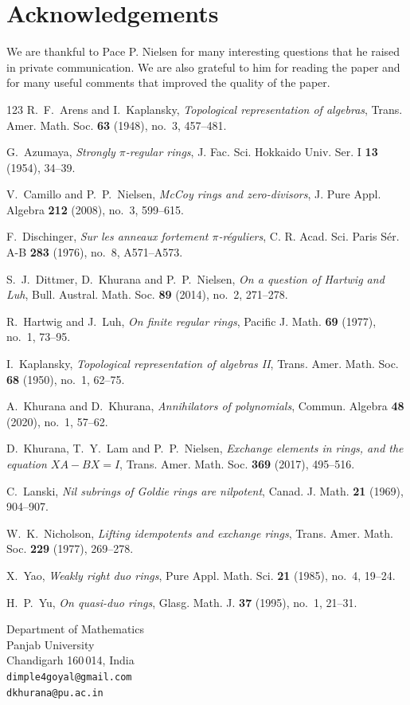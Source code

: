 \documentclass[12pt]{article}
\theoremstyle{plain}
\theoremstyle{definition}
\begin{document}
\section{Acknowledgements}
We are thankful to Pace P. Nielsen for many interesting questions that he raised in private communication. We are also grateful to him for reading the paper and for many useful comments that improved the quality of the paper. 
\begin{thebibliography}{123}
 R.~F.~Arens and I.~Kaplansky, {\em Topological representation of algebras}, 
Trans. Amer. Math. Soc. {\bf 63} (1948), no.~3, 457--481.

 G.~Azumaya, {\em Strongly $\pi$-regular rings}, 
J. Fac. Sci. Hokkaido Univ. Ser. I {\bf 13} (1954), 34--39.

 V.~Camillo and P.~P.~Nielsen, {\em McCoy rings and zero-divisors}, 
J. Pure Appl. Algebra {\bf 212} (2008), no.~3, 599--615.

 F.~Dischinger, {\em Sur les anneaux fortement $\pi$-réguliers}, 
C. R. Acad. Sci. Paris Sér. A-B {\bf 283} (1976), no.~8, A571--A573.

 S.~J.~Dittmer, D.~Khurana and P.~P.~Nielsen, {\em On a question of Hartwig and Luh}, 
Bull. Austral. Math. Soc. {\bf 89} (2014), no.~2, 271--278.

 R.~Hartwig and J.~Luh, {\em On finite regular rings}, 
Pacific J. Math. {\bf 69} (1977), no.~1, 73--95.

 I.~Kaplansky, {\em Topological representation of algebras II}, 
Trans. Amer. Math. Soc. {\bf 68} (1950), no.~1, 62--75.

 A.~Khurana and D.~Khurana, {\em Annihilators of polynomials}, 
Commun. Algebra {\bf 48} (2020), no.~1, 57--62.

 D.~Khurana, T.~Y.~Lam and P.~P.~Nielsen, 
{\em Exchange elements in rings, and the equation $XA - BX = I$}, 
Trans. Amer. Math. Soc. {\bf 369} (2017), 495--516.

 C.~Lanski, {\em Nil subrings of Goldie rings are nilpotent}, 
Canad. J. Math. {\bf 21} (1969), 904--907.

 W.~K.~Nicholson, {\em Lifting idempotents and exchange rings}, 
Trans. Amer. Math. Soc. {\bf 229} (1977), 269--278.

 X.~Yao, {\em Weakly right duo rings}, 
Pure Appl. Math. Sci. {\bf 21} (1985), no.~4, 19--24.

 H.~P.~Yu, {\em On quasi-duo rings}, 
Glasg. Math. J. {\bf 37} (1995), no.~1, 21--31.



	

	

\end{thebibliography}
	
	
	\bigskip
	\noindent Department of Mathematics \\
	\noindent  Panjab University \\
	\noindent  Chandigarh 160\,014, India\\[2mm]
	{\tt dimple4goyal@gmail.com}\\[1mm]
	{\tt dkhurana@pu.ac.in}\\[1mm]
	
	
\end{document}
